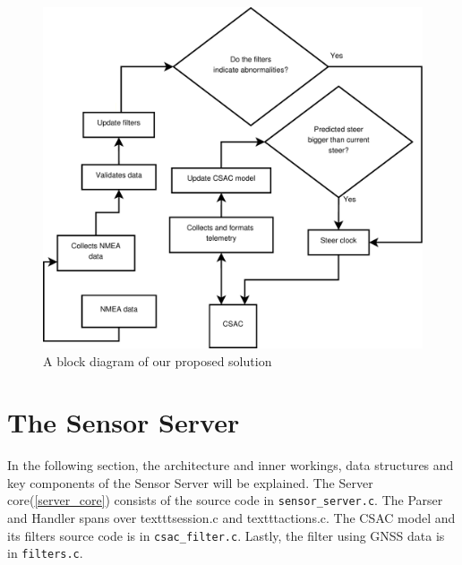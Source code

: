 \documentclass[12pt,english,a4paper]{report}
\begin{document}
\begin{figure}\label{bd}
  \includegraphics[scale=0.4]{master_sketch_arrows.pdf}
   \caption[CSAC SMACC Block diagram]{A block diagram of our proposed solution}
\end{figure}

\section{The Sensor Server}
In the following section, the architecture and inner workings, data structures and key components of the Sensor Server will be explained. The Server core(\ref{server_core}) consists of the source code in \texttt{sensor\_server.c}. The Parser and Handler spans over texttt{session.c} and texttt{actions.c}. The CSAC model and its filters source code is in \texttt{csac\_filter.c}. Lastly, the filter using GNSS data is in \texttt{filters.c}.  
\end{document}
